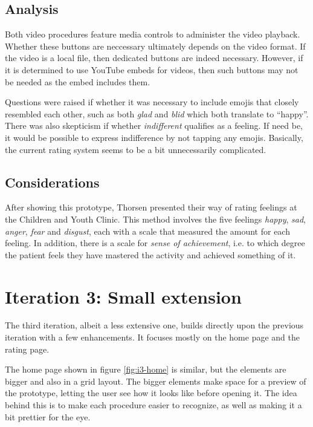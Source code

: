 \subsection{Analysis}

Both video procedures feature media controls to administer the video playback. Whether these buttons are neccessary ultimately depends on the video format. If the video is a local file, then dedicated buttons are indeed necessary. However, if it is determined to use YouTube embeds for videos, then such buttons may not be needed as the embed includes them.

Questions were raised if whether it was necessary to include emojis that closely resembled each other, such as both \emph{glad} and \emph{blid} which both translate to \enquote{happy}. There was also skepticism if whether \emph{indifferent} qualifies as a feeling. If need be, it would be possible to express indifference by not tapping any emojis. Basically, the current rating system seems to be a bit unnecessarily complicated.

\subsection{Considerations}

After showing this prototype, Thorsen presented their way of rating feelings at the Children and Youth Clinic. This method involves the five feelings \emph{happy}, \emph{sad}, \emph{anger}, \emph{fear} and \emph{disgust}, each with a scale that measured the amount for each feeling. In addition, there is a scale for \emph{sense of achievement}, i.e. to which degree the patient feels they have mastered the activity and achieved something of it.

\section{Iteration 3: Small extension}
\label{sec:iteration3}

The third iteration, albeit a less extensive one, builds directly upon the previous iteration with a few enhancements. It focuses mostly on the home page and the rating page.

The home page shown in figure \ref{fig:i3-home} is similar, but the elements are bigger and also in a grid layout. The bigger elements make space for a preview of the prototype, letting the user see how it looks like before opening it. The idea behind this is to make each procedure easier to recognize, as well as making it a bit prettier for the eye.


